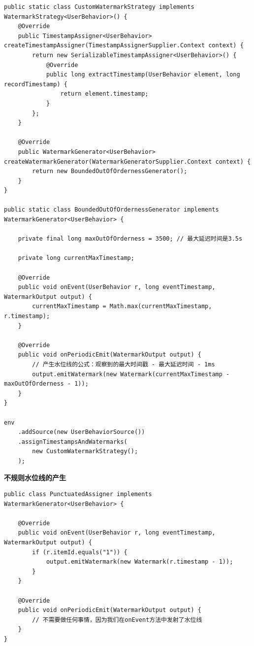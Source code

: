 \documentclass[cn,11pt,chinese]{elegantbook}
\begin{document}
\begin{verbatim}
public static class CustomWatermarkStrategy implements WatermarkStrategy<UserBehavior>() {
    @Override
    public TimestampAssigner<UserBehavior> createTimestampAssigner(TimestampAssignerSupplier.Context context) {
        return new SerializableTimestampAssigner<UserBehavior>() {
            @Override
            public long extractTimestamp(UserBehavior element, long recordTimestamp) {
                return element.timestamp;
            }
        };
    }

    @Override
    public WatermarkGenerator<UserBehavior> createWatermarkGenerator(WatermarkGeneratorSupplier.Context context) {
        return new BoundedOutOfOrdernessGenerator();
    }
}

public static class BoundedOutOfOrdernessGenerator implements WatermarkGenerator<UserBehavior> {
    
    private final long maxOutOfOrderness = 3500; // 最大延迟时间是3.5s
    
    private long currentMaxTimestamp;
    
    @Override
    public void onEvent(UserBehavior r, long eventTimestamp, WatermarkOutput output) {
        currentMaxTimestamp = Math.max(currentMaxTimestamp, r.timestamp);
    }
    
    @Override
    public void onPeriodicEmit(WatermarkOutput output) {
        // 产生水位线的公式：观察到的最大时间戳 - 最大延迟时间 - 1ms
        output.emitWatermark(new Watermark(currentMaxTimestamp - maxOutOfOrderness - 1));
    }
}

env
    .addSource(new UserBehaviorSource())
    .assignTimestampsAndWatermarks(
        new CustomWatermarkStrategy();
    );
\end{verbatim}

\textbf{不规则水位线的产生}

\begin{verbatim}
public class PunctuatedAssigner implements WatermarkGenerator<UserBehavior> {
    
    @Override
    public void onEvent(UserBehavior r, long eventTimestamp, WatermarkOutput output) {
        if (r.itemId.equals("1")) {
            output.emitWatermark(new Watermark(r.timestamp - 1));
        }
    }
    
    @Override
    public void onPeriodicEmit(WatermarkOutput output) {
        // 不需要做任何事情，因为我们在onEvent方法中发射了水位线
    }
}
\end{verbatim}
\end{document}
